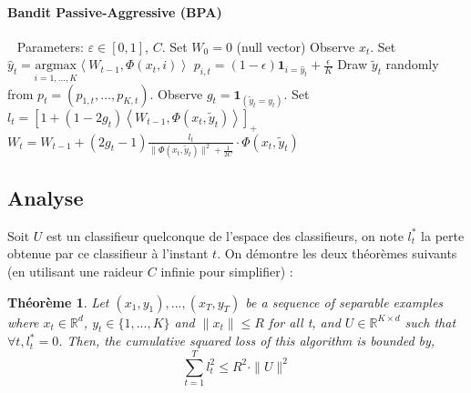 \documentclass[twocolumn]{article}
\newtheorem{theorem}{Théorème}
\begin{document}
\paragraph{Bandit Passive-Aggressive (BPA)}
	\begin{algorithmic}
		\STATE $\ \ $
		\STATE Parameters:  $\varepsilon\in [0,1]$, $C$.
		\STATE Set $W_0 = 0$ (null vector)
		\STATE Observe $x_t$.
		\STATE Set $\hat{y}_t = \underset{i = 1,\dots,K}{\text{argmax}}\left\langle W_{t-1} ,\Phi(x_t,i)\right\rangle$
		\STATE $p_{i,t}= (1-\epsilon)\mathbf{1}_{i = \hat{y}_t} + \frac{\epsilon}{K}$
		\ENDFOR
		\STATE Draw $\tilde{y}_t$ randomly from $p_t = \left(p_{1,t},\dots ,p_{K,t}\right)$.
		\STATE Observe $g_t = \mathbf{1}_{(\tilde{y}_t=y_t)}$.
		\STATE Set $l_t = [ 1+(1-2g_t)\left\langle W_{t-1},\Phi(x_t,\tilde{y}_t)\right\rangle]_{+}$ 
		\STATE $W_t = W_{t-1} + (2g_t-1)\frac{l_t}{\parallel\Phi(x_t,\tilde{y}_t)\parallel^2 + \frac{1}{2C}}\cdot\Phi(x_t,\tilde{y}_t)$
		\ENDFOR
	\end{algorithmic}


\subsection{Analyse}
Soit $U$ est un classifieur quelconque de l'espace des classifieurs, on note $l_t^{\ast}$ la perte obtenue par ce classifieur à l'instant $t$. On démontre les deux théorèmes suivants (en utilisant une raideur $C$ infinie pour simplifier) :

\begin{theorem}
	\label{theo:BPAT1}
	Let $(x_1,y_1),...,(x_T,y_T)$ be a sequence of separable examples where $x_t \in \mathbb{R}^d$, $y_t\in \{1,...,K\}$ and $\parallel x_t \parallel\leqslant R$ for all t, and $U \in \mathbb{R}^{K\times d}$ such that $ \forall t, l^*_t=0$. Then, the cumulative squared loss of this algorithm is bounded by,
	\begin{equation}
	\sum_{t=1}^{T} l_t^2 \leqslant R^2\cdot \parallel{U}\parallel^2
	\end{equation}
\end{theorem}
\end{document}
